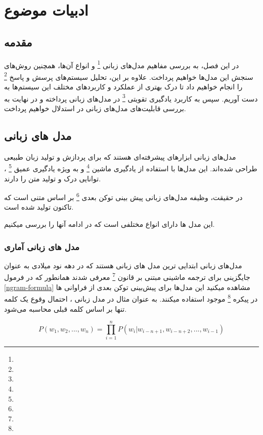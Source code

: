 \chapter{ادبیات موضوع}
\section{مقدمه}
در این فصل، به بررسی مفاهیم مدل‌های زبانی
\footnote{}
و انواع آن‌ها، همچنین روش‌های سنجش این مدل‌ها خواهیم پرداخت. علاوه بر این، تحلیل سیستم‌های پرسش و پاسخ
\footnote{}
را انجام خواهیم داد تا درک بهتری از عملکرد و کاربردهای مختلف این سیستم‌ها به دست آوریم. سپس به کاربرد یادگیری تقویتی
\footnote{}
در مدل‌های زبانی پرداخته و در نهایت به بررسی قابلیت‌های مدل‌های زبانی در استدلال خواهیم پرداخت.

\section{مدل های زبانی}
مدل‌های زبانی ابزارهای پیشرفته‌ای هستند که برای پردازش و تولید زبان طبیعی طراحی شده‌اند. این مدل‌ها با استفاده از یادگیری ماشین
\footnote{}
 و به ویژه یادگیری عمیق
 \footnote{}
 ، توانایی درک و تولید متن را دارند.

در حقیقت، وظیفه مدل‌های زبانی پیش بینی توکن بعدی
 \footnote{}
 بر اساس متنی است که تاکنون تولید شده است.
 
 این مدل ها دارای انواع مختلفی است که در ادامه آنها را بررسی میکنیم.
\subsection{مدل های زبانی آماری}
مدل‌های زبانی
ابتدایی ترین مدل های زبانی هستند که در دهه نود میلادی به عنوان جایگزینی برای ترجمه ماشینی مبتنی بر قانون
\footnote{}
معرفی شدند
\cite{b5}
همانطور که در فرمول 
\ref{ngram-formula}
مشاهده میکنید این مدل‌ها برای پیش‌بینی توکن بعدی از فراوانی 
ها در پیکره
\footnote{}
موجود استفاده میکنند. به عنوان مثال در مدل زبانی
، احتمال وقوع یک کلمه تنها بر اساس کلمه قبلی محاسبه می‌شود.

\begin{equation*}
	\label{ngram-formula}
	P(w_1, w_2, ..., w_n) = \prod_{i=1}^{n} P(w_i | w_{i-n+1}, w_{i-n+2}, ..., w_{i-1})
\end{equation*}



